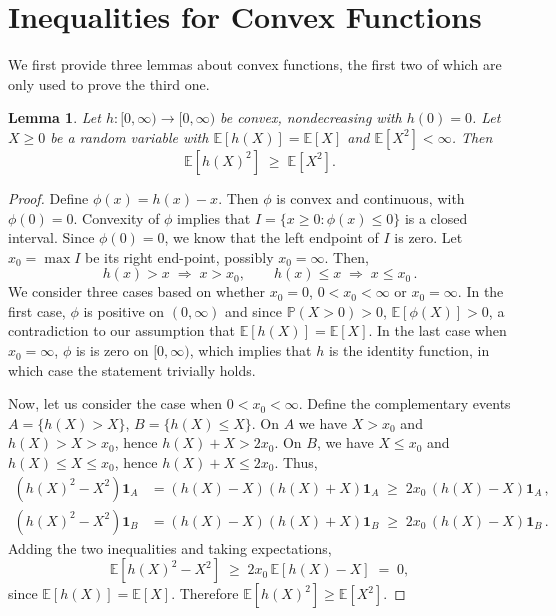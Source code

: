 \documentclass[letter, 12pt]{report}
\newcommand{\1}{\mathbf{1}}
\theoremstyle{plain}
\newtheorem{lemma}[theorem]{Lemma}
\theoremstyle{definition}
\theoremstyle{remark}
\begin{document}
\section{Inequalities for Convex Functions}
We first provide three lemmas about convex functions,
the first two of which are only used to prove the third one.
\begin{lemma}
    \label{lem:convex1}
    Let $h:[0,\infty)\to[0,\infty)$ be convex, nondecreasing with $h(0)=0$.
    Let $X\ge 0$ be a random variable with $\mathbb{E}[h(X)]=\mathbb{E}[X]$ and $\mathbb{E}[X^2]<\infty$.
    Then
    \[
        \mathbb{E}[h(X)^2]\;\ge\;\mathbb{E}[X^2].
    \]
\end{lemma}
\begin{proof}
    Define $\phi(x)=h(x)-x$. Then $\phi$ is convex and continuous, with $\phi(0)=0$.
    Convexity of $\phi$ implies that $I = \{x\ge 0:\phi(x)\le 0\}$ is a closed interval. Since $\phi(0)=0$, we know that the left endpoint of $I$ is zero.
    Let $x_0 = \max I$ be its right end-point, possibly $x_0=\infty$.
    Then,
    \[
        h(x)> x \; \Rightarrow \; x> x_0,
        \qquad
        h(x)\le x\; \Rightarrow \; x \le x_0\,.
    \]
    We consider three cases based on whether $x_0=0$, $0<x_0<\infty$ or $x_0=\infty$.
    In the first case,
    $\phi$ is positive on $(0,\infty)$ and since $\mathbb{P}(X>0)>0$, $\mathbb{E}[\phi(X)]>0$, a contradiction to our assumption that $\mathbb{E}[h(X)] = \mathbb{E}[X]$.
    In the last case when $x_0=\infty$, $\phi$ is is zero on $[0,\infty)$, which implies that $h$ is the identity function, in which case the statement trivially holds.

    Now, let us consider the case when $0<x_0<\infty$.
    Define the complementary events $A=\{h(X)> X\}$,  $B=\{h(X)\le X\}$.
    On $A$ we have $X> x_0$ and $h(X)>X> x_0$, hence $h(X)+X> 2x_0$.
    On $B$, we have $X\le x_0$ and $h(X)\le X \le x_0$, hence $h(X)+X\le 2x_0$.
    Thus,
    \begin{align*}
        (h(X)^2-X^2)\mathbf{1}_A
         & =(h(X)-X)(h(X)+X)\mathbf{1}_A \;\ge\; 2x_0\,(h(X)-X)\mathbf{1}_A\,, \\
        (h(X)^2-X^2)\mathbf{1}_B
         & =(h(X)-X)(h(X)+X)\mathbf{1}_B \;\ge\; 2x_0\,(h(X)-X)\mathbf{1}_B\,.
    \end{align*}
    Adding the two inequalities and taking expectations,
    \[
        \mathbb{E}[h(X)^2-X^2]
        \;\ge\; 2x_0\,\mathbb{E}[h(X)-X]
        \;=\; 0,
    \]
    since $\mathbb{E}[h(X)]=\mathbb{E}[X]$.
    Therefore $\mathbb{E}[h(X)^2]\ge \mathbb{E}[X^2]$.
\end{proof}
\end{document}
